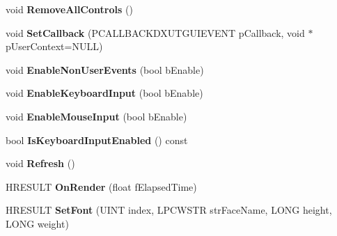 \begin{DoxyCompactItemize}
\item 
\hypertarget{class_c_d_x_u_t_dialog_a175f6919678485e740d460add2e5544b}{void {\bfseries Remove\+All\+Controls} ()}\label{class_c_d_x_u_t_dialog_a175f6919678485e740d460add2e5544b}

\item 
\hypertarget{class_c_d_x_u_t_dialog_a082c0600d7f516952cc4a935475f3c49}{void {\bfseries Set\+Callback} (P\+C\+A\+L\+L\+B\+A\+C\+K\+D\+X\+U\+T\+G\+U\+I\+E\+V\+E\+N\+T p\+Callback, void $\ast$p\+User\+Context=N\+U\+L\+L)}\label{class_c_d_x_u_t_dialog_a082c0600d7f516952cc4a935475f3c49}

\item 
\hypertarget{class_c_d_x_u_t_dialog_ab4fad093a2509e6813b22cd9342bbff1}{void {\bfseries Enable\+Non\+User\+Events} (bool b\+Enable)}\label{class_c_d_x_u_t_dialog_ab4fad093a2509e6813b22cd9342bbff1}

\item 
\hypertarget{class_c_d_x_u_t_dialog_a0022392f6e443b015ad8692aa6ab5442}{void {\bfseries Enable\+Keyboard\+Input} (bool b\+Enable)}\label{class_c_d_x_u_t_dialog_a0022392f6e443b015ad8692aa6ab5442}

\item 
\hypertarget{class_c_d_x_u_t_dialog_a109b115dd423e6cb42c7fc02bea65ea3}{void {\bfseries Enable\+Mouse\+Input} (bool b\+Enable)}\label{class_c_d_x_u_t_dialog_a109b115dd423e6cb42c7fc02bea65ea3}

\item 
\hypertarget{class_c_d_x_u_t_dialog_abfe2dae7b0eb882e25786ba20d52fc33}{bool {\bfseries Is\+Keyboard\+Input\+Enabled} () const }\label{class_c_d_x_u_t_dialog_abfe2dae7b0eb882e25786ba20d52fc33}

\item 
\hypertarget{class_c_d_x_u_t_dialog_a2fdbbfcd91be886b5843e790336b2f17}{void {\bfseries Refresh} ()}\label{class_c_d_x_u_t_dialog_a2fdbbfcd91be886b5843e790336b2f17}

\item 
\hypertarget{class_c_d_x_u_t_dialog_acce59cefc90be252813be4c4e363fd03}{H\+R\+E\+S\+U\+L\+T {\bfseries On\+Render} (float f\+Elapsed\+Time)}\label{class_c_d_x_u_t_dialog_acce59cefc90be252813be4c4e363fd03}

\item 
\hypertarget{class_c_d_x_u_t_dialog_a04466dc5ca32546b327aa76e1b57d970}{H\+R\+E\+S\+U\+L\+T {\bfseries Set\+Font} (U\+I\+N\+T index, L\+P\+C\+W\+S\+T\+R str\+Face\+Name, L\+O\+N\+G height, L\+O\+N\+G weight)}\label{class_c_d_x_u_t_dialog_a04466dc5ca32546b327aa76e1b57d970}


\end{DoxyCompactItemize}
